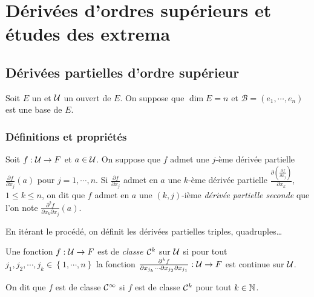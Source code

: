 \chapter{Dérivées d'ordres supérieurs et études des extrema}


\sld{\vfill\pagebreak[5]}%
\section{Dérivées partielles d'ordre supérieur}

Soit $E$ un \rev{} et $\mathcal{U}$ un ouvert de $E$. On suppose  que $\dim E = n$ et $\mathcal B = \left( e_1,\cdots,e_n \right)$ est une base de $E$.

\subsection{Définitions et propriétés}

\begin{definition}
	Soit $f: \mathcal{U} \to F$ et  $a\in\mathcal{U}$. On suppose que $f$ admet une $j$-ème dérivée partielle $\frac{\partial f}{\partial x_j} (a)$ pour $j=1,\cdots,n$. Si $\frac{\partial f}{\partial x_j}$ admet en $a$ une $k$-ème dérivée partielle $\frac{\partial \left(\frac{\partial f}{\partial x_j}\right)}{\partial x_k} $, $1 \leq k \leq n$, on dit que $f$ admet en $a$ une $(k,j)$-ième \emph{dérivée partielle seconde} que l'on note $\frac{\partial^2 f}{\partial x_k \partial x_j} (a)$.
\end{definition}

\begin{remark}
	En itérant le procédé, on définit les dérivées partielles triples, quadruples\ldots
\end{remark}


\sld{\vfill\pagebreak[5]}%
\begin{definition}
	Une fonction $f:\mathcal{U} \to F$ est de \emph{classe $\mathcal{C}^k$} sur $\mathcal{U}$ si pour tout $j_1,j_2,\cdots,j_k \in \left\{ 1,\cdots,n \right\}$
la fonction $\frac{\partial^k f}{\partial x_{j_k} \cdots   \partial x_{j_2}\partial x_{j_1} }: \mathcal{U} \to F$ est continue sur $\mathcal{U}$.

On dit que $f$ est de classe $\mathcal{C}^\infty$ si $f$ est de classe $\mathcal{C}^k$ pour tout $k\in\mathbb{N}$.
\end{definition}


